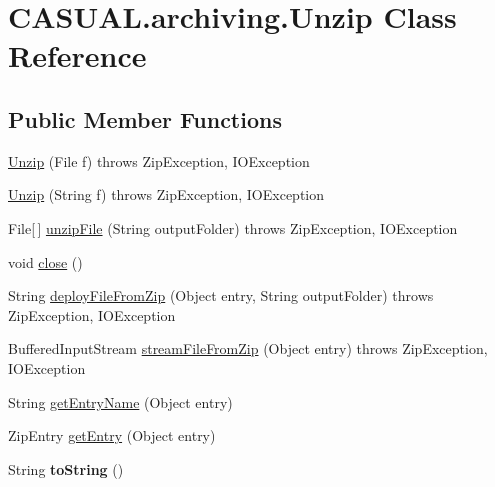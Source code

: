 \hypertarget{class_c_a_s_u_a_l_1_1archiving_1_1_unzip}{\section{C\-A\-S\-U\-A\-L.\-archiving.\-Unzip Class Reference}
\label{class_c_a_s_u_a_l_1_1archiving_1_1_unzip}
}
\subsection*{Public Member Functions}
\begin{DoxyCompactItemize}
\item 
\hyperlink{class_c_a_s_u_a_l_1_1archiving_1_1_unzip_a88ff2e111af2352f8101ea87acc2d6d4}{Unzip} (File f)  throws Zip\-Exception, I\-O\-Exception 
\item 
\hyperlink{class_c_a_s_u_a_l_1_1archiving_1_1_unzip_abc708c4bf25ed0e0edeabf0c71bbd344}{Unzip} (String f)  throws Zip\-Exception, I\-O\-Exception 
\item 
File\mbox{[}$\,$\mbox{]} \hyperlink{class_c_a_s_u_a_l_1_1archiving_1_1_unzip_ad4e2cb0ca56505d6acce008446d76188}{unzip\-File} (String output\-Folder)  throws Zip\-Exception, I\-O\-Exception 
\item 
void \hyperlink{class_c_a_s_u_a_l_1_1archiving_1_1_unzip_a14b0d899780a66d69b01ac7034d4a90e}{close} ()
\item 
String \hyperlink{class_c_a_s_u_a_l_1_1archiving_1_1_unzip_a568a39dbfeb9064924d41b441da6e454}{deploy\-File\-From\-Zip} (Object entry, String output\-Folder)  throws Zip\-Exception, I\-O\-Exception 
\item 
Buffered\-Input\-Stream \hyperlink{class_c_a_s_u_a_l_1_1archiving_1_1_unzip_a285658d9e0121e2859a2c35600a0c9d0}{stream\-File\-From\-Zip} (Object entry)  throws Zip\-Exception, I\-O\-Exception 
\item 
String \hyperlink{class_c_a_s_u_a_l_1_1archiving_1_1_unzip_a750b1ed907dfd4da6931289e53094754}{get\-Entry\-Name} (Object entry)
\item 
Zip\-Entry \hyperlink{class_c_a_s_u_a_l_1_1archiving_1_1_unzip_aebf6db26bcbca3b4f76833f8372c6302}{get\-Entry} (Object entry)
\item 
\hypertarget{class_c_a_s_u_a_l_1_1archiving_1_1_unzip_a877ef83929ff90391a6833da374136c8}{String {\bfseries to\-String} ()}\label{class_c_a_s_u_a_l_1_1archiving_1_1_unzip_a877ef83929ff90391a6833da374136c8}


\end{DoxyCompactItemize}
